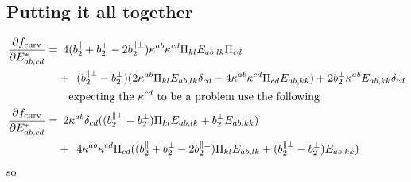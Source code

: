 \documentclass[11pt]{article}
\begin{document}
\subsection{Putting it all together}
\begin{align}
    \pdv{f_\text{curv}}{E_{ab,cd}^*}=&\enspace 4(b_2^\parallel + b_2^\perp - 2b_2^{\parallel\perp})\kappa^{ab}\kappa^{cd} \Pi_{kl}E_{ab,lk}\Pi_{cd} \\
    &+\enspace (b_2^{\parallel\perp} - b_2^\perp)(2\kappa^{ab} \Pi_{kl}E_{ab,lk} \delta_{cd} + 4\kappa^{ab}\kappa^{cd} \Pi_{cd}E_{ab,kk}) + 2b_2^\perp \kappa^{ab} E_{ab,kk} \delta_{cd} \nonumber \\
    &\qq{expecting the $\kappa^{cd}$ to be a problem use the following} \nonumber \\
    \pdv{f_\text{curv}}{E_{ab,cd}^*}=&\enspace 2\kappa^{ab}\delta_{cd} ((b_2^{\parallel\perp}-b_2^\perp)\Pi_{kl}E_{ab,lk}+b_2^\perp E_{ab,kk}) \\
    &+\enspace 4\kappa^{ab}\kappa^{cd} \Pi_{cd} ((b_2^\parallel + b_2^\perp - 2b_2^{\parallel\perp})\Pi_{kl}E_{ab,lk} + (b_2^{\parallel\perp}-b_2^\perp)E_{ab,kk})
\end{align}
so
\end{document}
